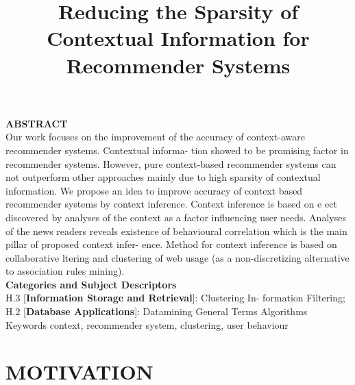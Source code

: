 \documentclass[10pt]{extarticle}
\date{}
\begin{document}
\title{\LARGE \textbf{Reducing the Sparsity of Contextual Information for
Recommender Systems}}

\maketitle
\begin{multicols}{2}


\noindent\large{\textbf{ABSTRACT}} \\

\noindent \small Our  work  focuses  on  the  improvement  of  the  accuracy  of
context-aware recommender systems.  Contextual informa-
tion showed to be promising factor in recommender systems.
However, pure context-based recommender systems can not
outperform  other  approaches  mainly  due  to  high  sparsity
of contextual information.  We propose an idea to improve
accuracy of context based recommender systems by context
inference.   Context  inference  is  based  on  e ect  discovered
by analyses of the context as a factor influencing user needs.
Analyses of the news readers reveals existence of behavioural
correlation which is the main pillar of proposed context infer-
ence.  Method for context inference is based on collaborative
 ltering and clustering of web usage (as a non-discretizing
alternative to association rules mining). \\


\noindent\large\textbf{Categories and Subject Descriptors} \\


\noindent\small  H.3 [\textbf{Information Storage and Retrieval}]: Clustering In-
formation Filtering;  
H.2 [\textbf{Database Applications}]:  Datamining General Terms
Algorithms
Keywords
context, recommender system, clustering, user behaviour

\section{MOTIVATION} 


\end{multicols}
\end{document}
